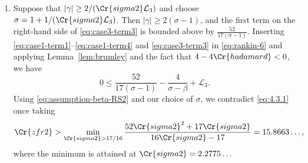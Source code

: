 \documentclass[12pt,reqno]{amsart}
\theoremstyle{remark}
\numberwithin{equation}{section}
\begin{document}
    \begin{enumerate}[ leftmargin=1cm]
        \item\label{thm3-case1.1} Suppose that $|\gamma| \ge {2}/({\Cr{sigma2}\mathcal{L}_3})$ and choose $\sigma = 1+ 1/({\Cr{sigma2}\mathcal{L}_3})$. 
        Then $|\gamma| \ge 2(\sigma-1)$, and the first term on the right-hand side of \eqref{eq:case3-term3} is bounded above by $\frac{52}{17(\sigma-1)}$.
	Inserting \eqref{eq:case1-term1}--\eqref{eq:case1-term4} and \eqref{eq:case3-term3} in \eqref{eq:rankin-6} and applying Lemma~\ref{lem:brumley} and the fact that $4-4\Cr{hadamard} <0$, we have
	\begin{equation}\label{eq:4.3.1}
	    0 \le \frac{52}{17(\sigma-1)}-\frac{4}{\sigma-\beta}+\mathcal{L}_3.
	\end{equation}
     Using \eqref{eq:assumption-beta-RS2} and our choice of $\sigma$, we contradict \eqref{eq:4.3.1} once taking 
     \begin{equation}\label{eq:minimizer-rankin-1}
         \Cr{zfr2} > \min_{\Cr{sigma2} > 17/16} \frac{52\Cr{sigma2}^2+17\Cr{sigma2}}{16\Cr{sigma2}-17} = 15.8663\ldots,
     \end{equation}
        where the minimum is attained at $\Cr{sigma2} = 2.2775\ldots$
   
	

\end{enumerate}
\end{document}
